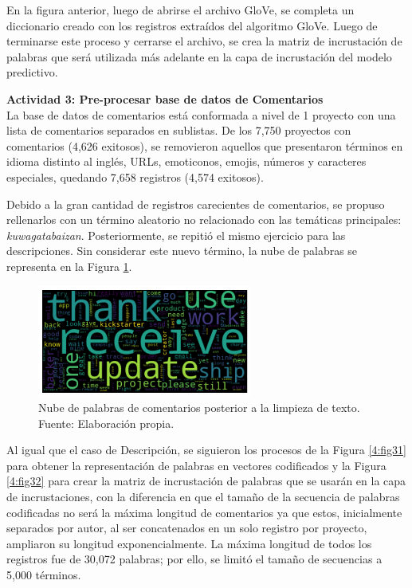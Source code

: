 En la figura anterior, luego de abrirse el archivo GloVe, se completa un diccionario creado con los registros extraídos del algoritmo GloVe. Luego de terminarse este proceso y cerrarse el archivo, se crea la matriz de incrustación de palabras que será utilizada más adelante en la capa de incrustación del modelo predictivo.

\textbf{Actividad 3: Pre-procesar base de datos de Comentarios}
\\
La base de datos de comentarios está conformada a nivel de 1 proyecto con una lista de comentarios separados en sublistas. De los 7,750 proyectos con comentarios (4,626 exitosos), se removieron aquellos que presentaron términos en idioma distinto al inglés, URLs, emoticonos, emojis, números y caracteres especiales, quedando 7,658 registros (4,574 exitosos).

Debido a la gran cantidad de registros carecientes de comentarios, se propuso rellenarlos con un término aleatorio no relacionado con las temáticas principales: \textit{kuwagatabaizan}. Posteriormente, se repitió el mismo ejercicio para las descripciones. Sin considerar este nuevo término, la nube de palabras se representa en la Figura \ref{4:fig33}.

\begin{figure}[!ht]
	\begin{center}
		\includegraphics[width=0.63\textwidth]{4/figures/comments_wordcloud_processed.png}
		\caption[Nube de palabras de comentarios posterior a la limpieza de texto]{Nube de palabras de comentarios posterior a la limpieza de texto.\\
			Fuente: Elaboración propia.}
		\label{4:fig33}
	\end{center}
\end{figure}

Al igual que el caso de Descripción, se siguieron los procesos de la Figura \ref{4:fig31} para obtener la representación de palabras en vectores codificados y la Figura \ref{4:fig32} para crear la matriz de incrustación de palabras que se usarán en la capa de incrustaciones, con la diferencia en que el tamaño de la secuencia de palabras codificadas no será la máxima longitud de comentarios ya que estos, inicialmente separados por autor, al ser concatenados en un solo registro por proyecto, ampliaron su longitud exponencialmente. La máxima longitud de todos los registros fue de 30,072 palabras; por ello, se limitó el tamaño de secuencias a 5,000 términos.